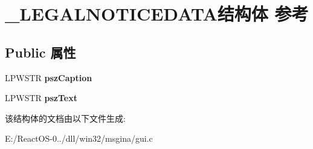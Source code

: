\hypertarget{struct___l_e_g_a_l_n_o_t_i_c_e_d_a_t_a}{}\section{\+\_\+\+L\+E\+G\+A\+L\+N\+O\+T\+I\+C\+E\+D\+A\+T\+A结构体 参考}
\label{struct___l_e_g_a_l_n_o_t_i_c_e_d_a_t_a}
\subsection*{Public 属性}
\begin{DoxyCompactItemize}
\item 
\mbox{\label{struct___l_e_g_a_l_n_o_t_i_c_e_d_a_t_a_a3bf7d1292a0fec492f602a7c588d4769}} 
L\+P\+W\+S\+TR {\bfseries psz\+Caption}
\item 
\mbox{\label{struct___l_e_g_a_l_n_o_t_i_c_e_d_a_t_a_a369fb94422867e294503166de19029b9}} 
L\+P\+W\+S\+TR {\bfseries psz\+Text}
\end{DoxyCompactItemize}


该结构体的文档由以下文件生成\+:\begin{DoxyCompactItemize}
\item 
E\+:/\+React\+O\+S-\/0../dll/win32/msgina/gui.\+c\end{DoxyCompactItemize}
